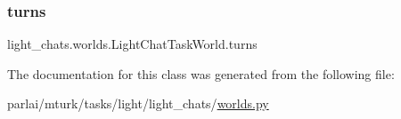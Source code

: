 \subsubsection{\texorpdfstring{turns}{turns}}
{\footnotesize\ttfamily light\+\_\+chats.\+worlds.\+Light\+Chat\+Task\+World.\+turns}



The documentation for this class was generated from the following file\+:\begin{DoxyCompactItemize}
\item 
parlai/mturk/tasks/light/light\+\_\+chats/\hyperlink{parlai_2mturk_2tasks_2light_2light__chats_2worlds_8py}{worlds.\+py}\end{DoxyCompactItemize}
